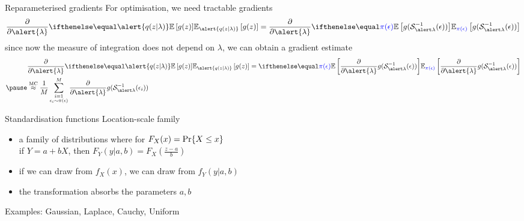 \documentclass[14pt]{beamer}
\begin{document}
\begin{frame}{Reparameterised gradients}
	For optimisation, we need tractable gradients
	\begin{equation*}
		\begin{aligned}
			\pdv{\alert{\lambda}}  \E[\alert{q(z|\lambda)}]{g(z)} = \pdv{\alert{\lambda}} \E[\textcolor{blue}{\pi(\epsilon)}]{g(\inv{\mathcal S}_{\alert\lambda}(\epsilon)) }
		\end{aligned}
	\end{equation*} \pause
	since now the measure of integration does not depend on $\lambda$, we can obtain a gradient estimate
	\begin{equation*}
		\begin{aligned}
			&\pdv{\alert{\lambda}}  \E[\alert{q(z|\lambda)}]{g(z)} =  \E[\textcolor{blue}{\pi(\epsilon)}]{\pdv{\alert{\lambda}} g(\inv{\mathcal S}_{\alert\lambda}(\epsilon)) } \\ \pause
			&\overset{\text{MC}}{\approx}  \frac{1}{M} \sum_{\substack{i=1\\ \epsilon_i \sim \pi(\epsilon)}}^M \pdv{\alert{\lambda}} g(\inv{\mathcal S}_{\alert\lambda}(\epsilon_i)) 
		\end{aligned}
	\end{equation*}
\end{frame}

\begin{frame}{Standardisation functions}
	Location-scale family
	\begin{itemize}
		\item a family of distributions where for $F_X(x) = \operatorname{Pr}\{X \le x\}$ \\
		if $Y=a + b X$, then  $F_Y(y|a, b)=F_X(\frac{z-a}{b})$ \pause
		\item if we can draw from $f_X(x)$, we can draw from $f_Y(y|a,b)$ \pause
		\item the transformation absorbs the parameters $a, b$
	\end{itemize}
	
	\pause
	
	Examples: Gaussian, Laplace, Cauchy, Uniform
	
\end{frame}
\end{document}
